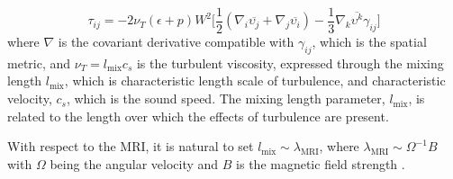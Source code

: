 \begin{equation}
\tau_{ij} = %
-2 \nu_T (\epsilon + p)W^2\Big[ \frac{1}{2} (\nabla_i\overline{\upsilon_j} + \nabla_j\overline{\upsilon_i}) - \frac{1}{3}\nabla_k\overline{\upsilon^k}\gamma_{ij} \Big]
\end{equation}
%
where $\nabla$ is the covariant derivative compatible with $\gamma_{ij}$, which is the spatial metric, 
and $\nu_T = l_{\text{mix}}c_s$ is the turbulent viscosity, expressed through the mixing length
$l_{\text{mix}}$, which is characteristic length scale of turbulence, and characteristic velocity, 
$c_s$, which is the sound speed.
%
%
%
%
The mixing length parameter, $l_{\text{mix}}$, is related to the length over which the effects of 
turbulence are present. 
%
%
%



With respect to the \ac{MRI}, it is natural to set $l_{\text{mix}} \sim \lambda_{\text{MRI}}$, where
$\lambda_{\text{MRI}} \sim \Omega^{-1}B$ with $\Omega$ being the angular velocity and $B$ is the magnetic
field strength \citep{Duez:2006qe}.

